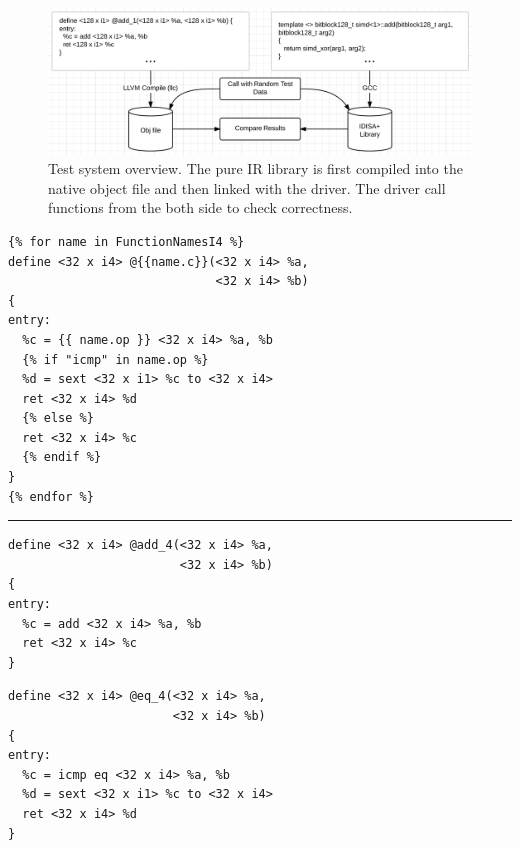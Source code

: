 \begin{figure}[ht!]
\centering
\includegraphics[width=140mm]{draw/test.png}
\caption[Test system overview.]{Test system overview. The pure IR library is first compiled into the native object file and then linked with the driver. The driver call functions from the both side to check correctness.}
\label{figure:test}
\end{figure}

\begin{program}
\begin{verbatim}
{% for name in FunctionNamesI4 %}
define <32 x i4> @{{name.c}}(<32 x i4> %a,
                             <32 x i4> %b)
{
entry:
  %c = {{ name.op }} <32 x i4> %a, %b
  {% if "icmp" in name.op %}
  %d = sext <32 x i1> %c to <32 x i4>
  ret <32 x i4> %d
  {% else %}
  ret <32 x i4> %c
  {% endif %}
}
{% endfor %}
\end{verbatim}
\rule{\textwidth}{1pt}

\begin{multicols}{2}
\begin{verbatim}
define <32 x i4> @add_4(<32 x i4> %a,
                        <32 x i4> %b)
{
entry:
  %c = add <32 x i4> %a, %b
  ret <32 x i4> %c
}
\end{verbatim}
\columnbreak
\begin{verbatim}
define <32 x i4> @eq_4(<32 x i4> %a,
                       <32 x i4> %b)
{
entry:
  %c = icmp eq <32 x i4> %a, %b
  %d = sext <32 x i1> %c to <32 x i4>
  ret <32 x i4> %d
}
\end{verbatim}
\end{multicols}
\caption[Templates for the IR Libray]{Templates for the IR Library. On the top is the template, and two different output are listed below. We use embedded for loop and if statements.}
\label{program:jinja}
\end{program}
